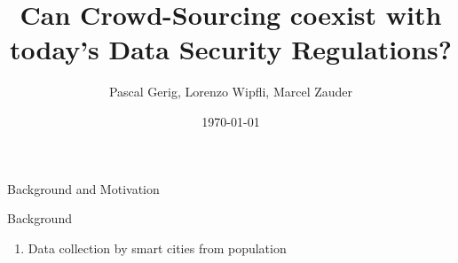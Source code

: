 \documentclass{beamer}
\begin{document}
	\author{Pascal Gerig, Lorenzo Wipfli, Marcel Zauder}
	\title{Can Crowd-Sourcing coexist with today's Data Security Regulations?}
	\date{\today}

\begin{frame}
	\titlepage
\end{frame}



\begin{frame}{Background and Motivation}
	\begin{block}{Background}
		\begin{enumerate}[]
			\item Data collection by smart cities from population
		\end{enumerate}
	\end{block}
\end{frame}
\end{document}
